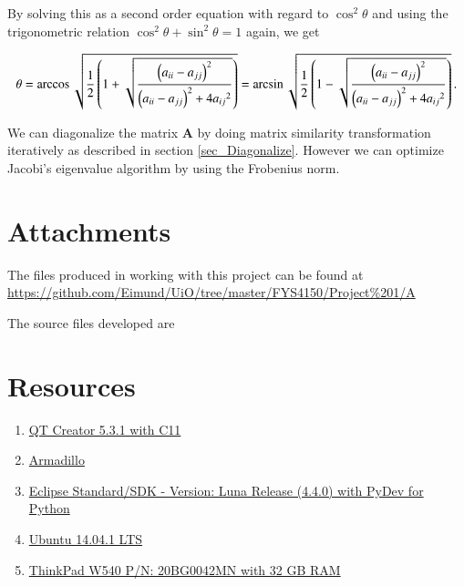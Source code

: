 \documentclass[11pt,english,a4paper]{article}
\begin{document}
\begin{flushleft}
By solving this as a second order equation with regard to $\cos^2\theta$ and using the trigonometric relation $\cos^2\theta+\sin^2\theta = 1$ again, we get

\begin{align}
\theta = \arccos\sqrt{\frac{1}{2}\left({1+\sqrt{\frac{\left({a_{ii}-a_{jj}}\right)^2}{\left({a_{ii}-a_{jj}}\right)^2+4{a_{ij}}^2}}}\right)} = \arcsin\sqrt{\frac{1}{2}\left({1-\sqrt{\frac{\left({a_{ii}-a_{jj}}\right)^2}{\left({a_{ii}-a_{jj}}\right)^2+4{a_{ij}}^2}}}\right)} \,.
\end{align}

We can diagonalize the matrix $\mathbf{A}$ by doing matrix similarity transformation iteratively as described in section \ref{sec_Diagonalize}. However we can optimize Jacobi's eigenvalue algorithm by using  the Frobenius norm.


\section{Attachments}

The files produced in working with this project can be found at \href{https://github.com/Eimund/UiO/tree/master/FYS4150/Project\%201/A}{https://github.com/Eimund/UiO/tree/master/FYS4150/Project\%201/A} \linebreak

The source files developed are


\section{Resources}

\begin{enumerate}
\item{\href{http://qt-project.org/downloads}{QT Creator 5.3.1 with C11}}
\item{\href{http://arma.sourceforge.net/}{Armadillo}}
\item{\href{https://www.eclipse.org/downloads/}{Eclipse Standard/SDK  - Version: Luna Release (4.4.0) with PyDev for Python}}
\item{\href{http://www.ubuntu.com/download/desktop}{Ubuntu 14.04.1 LTS}}
\item{\href{http://shop.lenovo.com/no/en/laptops/thinkpad/w-series/w540/#tab-reseller}{ThinkPad W540 P/N: 20BG0042MN with 32 GB RAM}}
\end{enumerate}


\end{flushleft}
\end{document}
